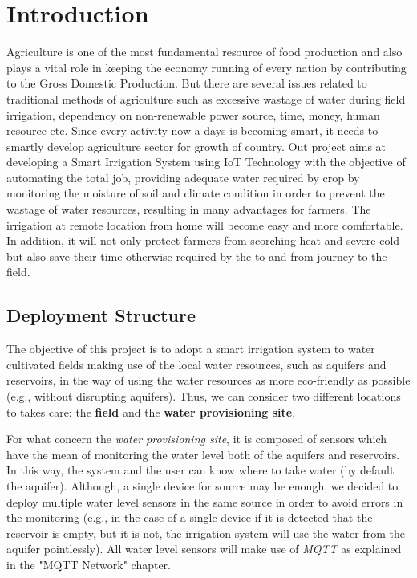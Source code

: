 \section{Introduction}
Agriculture is one of the most fundamental resource of food production and also plays a vital role in keeping the economy running of every nation by contributing to the Gross Domestic Production. But there are several issues related to traditional methods of agriculture such as excessive wastage of water during field irrigation, dependency on non-renewable power source, time, money, human resource etc. Since every activity now a days is becoming smart, it needs to smartly develop agriculture sector for growth of country. Out project aims at developing a Smart Irrigation System using IoT Technology with the objective of automating the total job, providing adequate water required by crop by monitoring the moisture of soil and climate condition in order to prevent the wastage of water resources, resulting in many advantages for farmers. The irrigation at remote location from home will become easy and more comfortable. In addition, it will not only protect farmers from scorching heat and severe cold but also save their time otherwise required by the to-and-from journey to the field.



\subsection{Deployment Structure}
The objective of this project is to adopt a smart irrigation system to water cultivated fields making use of the local water resources, such as aquifers and reservoirs, in the way of using the water resources as more eco-friendly as possible (e.g., without disrupting aquifers). Thus, we can consider two different locations to takes care: the \textbf{field} and the \textbf{water provisioning site},

For what concern the \textit{water provisioning site}, it is composed of sensors which have the mean of monitoring the water level both of the aquifers and reservoirs. In this way, the system and the user can know where to take water (by default the aquifer). Although, a single device for source may be enough, we decided to deploy multiple water level sensors in the same source in order to avoid errors in the monitoring (e.g., in the case of a single device if it is detected that the reservoir is empty, but it is not, the irrigation system will use the water from the aquifer pointlessly).
All water level sensors will make use of \textit{MQTT} as explained in the "MQTT Network" chapter.


